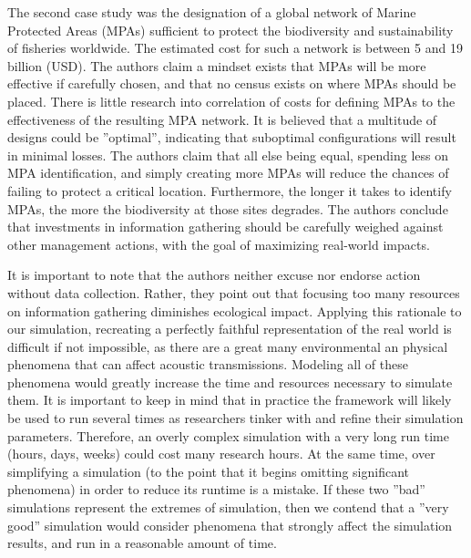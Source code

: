 The second case study was the designation of a global network of Marine Protected Areas (MPAs) sufficient to protect the biodiversity and sustainability of fisheries worldwide.  The estimated cost for such a network is between 5 and 19 billion (USD).  The authors claim a mindset exists that MPAs will be more effective if carefully chosen, and that no census exists on where MPAs should be placed. There is little research into correlation of costs for defining MPAs to the effectiveness of the resulting MPA network.  It is believed that a multitude of designs could be ''optimal'', indicating that suboptimal configurations will result in minimal losses.  The authors claim that all else being equal, spending less on MPA identification, and simply creating more MPAs will reduce the chances of failing to protect a critical location.  Furthermore, the longer it takes to identify MPAs, the more the biodiversity at those sites degrades.  The authors conclude that investments in information gathering should be carefully weighed against other management actions, with the goal of maximizing real-world impacts.

It is important to note that the authors neither excuse nor endorse action without data collection.  Rather, they point out that focusing too many resources on information gathering diminishes ecological impact.  Applying this rationale to our simulation, recreating a perfectly faithful representation of the real world is difficult if not impossible, as there are a great many environmental an physical phenomena that can affect acoustic transmissions.  Modeling all of these phenomena would greatly increase the time and resources necessary to simulate them.  It is important to keep in mind that in practice the framework will likely be used to run several times as researchers tinker with and refine their simulation parameters.  Therefore, an overly complex simulation with a very long run time (hours, days, weeks) could cost many research hours. At the same time, over simplifying a simulation (to the point that it begins omitting significant phenomena) in order to reduce its runtime is a mistake.  If these two ''bad'' simulations represent the extremes of simulation, then  we contend that a ''very good'' simulation would consider phenomena that strongly affect the simulation results, and run in a reasonable amount of time.  



